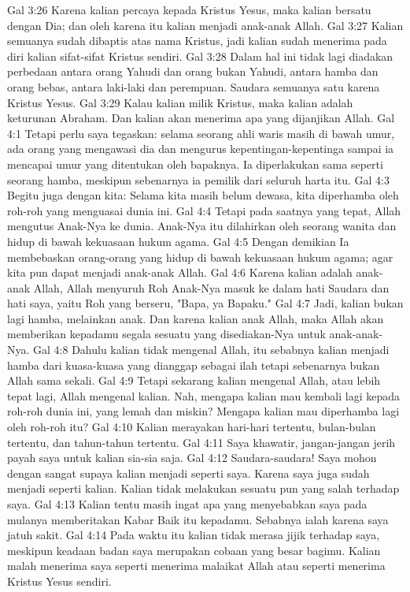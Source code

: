 Gal 3:26  Karena kalian percaya kepada Kristus Yesus, maka kalian bersatu dengan Dia; dan oleh karena itu kalian menjadi anak-anak Allah.
Gal 3:27  Kalian semuanya sudah dibaptis atas nama Kristus, jadi kalian sudah menerima pada diri kalian sifat-sifat Kristus sendiri.
Gal 3:28  Dalam hal ini tidak lagi diadakan perbedaan antara orang Yahudi dan orang bukan Yahudi, antara hamba dan orang bebas, antara laki-laki dan perempuan. Saudara semuanya satu karena Kristus Yesus.
Gal 3:29  Kalau kalian milik Kristus, maka kalian adalah keturunan Abraham. Dan kalian akan menerima apa yang dijanjikan Allah.
Gal 4:1  Tetapi perlu saya tegaskan: selama seorang ahli waris masih di bawah umur, ada orang yang mengawasi dia dan mengurus kepentingan-kepentinga sampai ia mencapai umur yang ditentukan oleh bapaknya. Ia diperlakukan sama seperti seorang hamba, meskipun sebenarnya ia pemilik dari seluruh harta itu.
Gal 4:3  Begitu juga dengan kita: Selama kita masih belum dewasa, kita diperhamba oleh roh-roh yang menguasai dunia ini.
Gal 4:4  Tetapi pada saatnya yang tepat, Allah mengutus Anak-Nya ke dunia. Anak-Nya itu dilahirkan oleh seorang wanita dan hidup di bawah kekuasaan hukum agama.
Gal 4:5  Dengan demikian Ia membebaskan orang-orang yang hidup di bawah kekuasaan hukum agama; agar kita pun dapat menjadi anak-anak Allah.
Gal 4:6  Karena kalian adalah anak-anak Allah, Allah menyuruh Roh Anak-Nya masuk ke dalam hati Saudara dan hati saya, yaitu Roh yang berseru, "Bapa, ya Bapaku."
Gal 4:7  Jadi, kalian bukan lagi hamba, melainkan anak. Dan karena kalian anak Allah, maka Allah akan memberikan kepadamu segala sesuatu yang disediakan-Nya untuk anak-anak-Nya.
Gal 4:8  Dahulu kalian tidak mengenal Allah, itu sebabnya kalian menjadi hamba dari kuasa-kuasa yang dianggap sebagai ilah tetapi sebenarnya bukan Allah sama sekali.
Gal 4:9  Tetapi sekarang kalian mengenal Allah, atau lebih tepat lagi, Allah mengenal kalian. Nah, mengapa kalian mau kembali lagi kepada roh-roh dunia ini, yang lemah dan miskin? Mengapa kalian mau diperhamba lagi oleh roh-roh itu?
Gal 4:10  Kalian merayakan hari-hari tertentu, bulan-bulan tertentu, dan tahun-tahun tertentu.
Gal 4:11  Saya khawatir, jangan-jangan jerih payah saya untuk kalian sia-sia saja.
Gal 4:12  Saudara-saudara! Saya mohon dengan sangat supaya kalian menjadi seperti saya. Karena saya juga sudah menjadi seperti kalian. Kalian tidak melakukan sesuatu pun yang salah terhadap saya.
Gal 4:13  Kalian tentu masih ingat apa yang menyebabkan saya pada mulanya memberitakan Kabar Baik itu kepadamu. Sebabnya ialah karena saya jatuh sakit.
Gal 4:14  Pada waktu itu kalian tidak merasa jijik terhadap saya, meskipun keadaan badan saya merupakan cobaan yang besar bagimu. Kalian malah menerima saya seperti menerima malaikat Allah atau seperti menerima Kristus Yesus sendiri.
